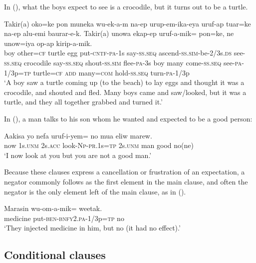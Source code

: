 In (), what the boys expect to see is a crocodile, but it turns out to be a turtle.

\ea%
\label{ex:x1393}
\gll Takir(a)  oko=ke  pon  muneka  wu-ek-a-m  na-ep urup-em-ika-eya  uruf-ap  tuar=ke  na-ep alu-emi  baurar-e-k.  Takir(a)  unowa  ekap-ep uruf-a-mik=  pon=ke,  ne  unow=iya  op-ap kirip-a-mik.\\
boy  other=\textsc{cf} turtle egg  put-\textsc{cntf}-\textsc{pa}-1s  say-\textsc{ss}.\textsc{seq} ascend-\textsc{ss}.\textsc{sim}-be-2/3s.\textsc{ds} see-\textsc{ss}.\textsc{seq} crocodile say-\textsc{ss}.\textsc{seq} shout-\textsc{ss}.\textsc{sim} flee-\textsc{pa}-3s boy  many come-\textsc{ss}.\textsc{seq} see-\textsc{pa}-1/3p=\textsc{tp} turtle=\textsc{cf} \textsc{add} many=\textsc{com} hold-\textsc{ss}.\textsc{seq} turn-\textsc{pa}-1/3p\\
\glt`A boy saw a turtle coming up (to the beach) to lay eggs and thought it was a crocodile, and shouted and fled. Many boys came and saw/looked, but it was a turtle, and they all together grabbed and turned it.'
\z
{}


In (), a man talks to his son whom he wanted and expected to be a good person:

\ea%
\label{ex:x1397}
\gll Aakisa  yo  nefa  uruf-i-yem= no  mua eliw marew.\\
now  1s.\textsc{unm} 2s.\textsc{acc} look-\textsc{Np}-\textsc{pr}.1s=\textsc{tp} 2s.\textsc{unm} man good no(ne)\\
\glt`I now look at you but you are not a good man.'
\z


Because these clauses express a cancellation or frustration of an expectation, a negator commonly follows as the first element in the main clause, and often the negator is the only element left of the main clause, as in ().

\ea%
\label{ex:x1398}
\gll Marasin  wu-om-a-mik=  weetak.\\
medicine put-\textsc{ben}-\textsc{bnfy}2.\textsc{pa}-1/3p=\textsc{tp} no\\
\glt`They injected medicine in him, but no (it had no effect).'
\z


\subsection{Conditional clauses} 

